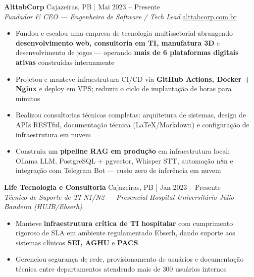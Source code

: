 \documentclass[a4paper]{article}
\begin{document}
\vspace{2mm}

\textbf{AlttabCorp} \hfill Cajazeiras, PB | Mai 2023 -- Presente\\
\textit{Fundador \& CEO — Engenheiro de Software / Tech Lead} \hfill \href{https://alttabcorp.com.br}{alttabcorp.com.br}\\
\vspace{-3mm}
\begin{itemize}[leftmargin=*, itemsep=-3pt]
    \item Fundou e escalou uma empresa de tecnologia multissetorial abrangendo
     \textbf{desenvolvimento web, consultoria em TI, manufatura 3D} e desenvolvimento de jogos — operando \textbf{mais de 6 plataformas digitais ativas} construídas internamente
    \item Projetou e manteve infraestrutura CI/CD via \textbf{GitHub Actions, Docker + Nginx} e deploy em VPS; reduziu o ciclo de implantação de horas para minutos
    \item Realizou consultorias técnicas completas: arquitetura de sistemas, design de APIs RESTful, documentação técnica (LaTeX/Markdown) e configuração de infraestrutura em nuvem
    \item Construiu um \textbf{pipeline RAG em produção} em infraestrutura local: Ollama LLM, PostgreSQL + pgvector, Whisper STT, automação n8n e integração com Telegram Bot — custo zero de inferência em nuvem
\end{itemize}

\vspace{2mm}

\textbf{Life Tecnologia e Consultoria} \hfill Cajazeiras, PB | Jan 2023 -- Presente\\
\textit{Técnico de Suporte de TI N1/N2 — Presencial} \hfill \textit{Hospital Universitário Júlio Bandeira (HUJB/Ebserh)}\\
\vspace{-3mm}
\begin{itemize}[leftmargin=*, itemsep=-3pt]
    \item Manteve \textbf{infraestrutura crítica de TI hospitalar} com cumprimento rigoroso de SLA em ambiente regulamentado Ebserh, dando suporte aos sistemas clínicos \textbf{SEI, AGHU} e \textbf{PACS}
    \item Gerenciou segurança de rede, provisionamento de usuários e documentação técnica entre departamentos atendendo mais de 300 usuários internos
\end{itemize}
\end{document}
